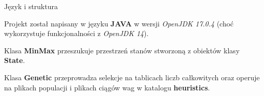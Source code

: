 \begin{frame}{Język i struktura}

    \large
    Projekt został napisany w języku \textbf{JAVA} w wersji \textit{OpenJDK 17.0.4} (choć wykorzystuje funkcjonalności z \textit{OpenJDK 14}).
    
    Klasa \textbf{MinMax} przeszukuje przestrzeń stanów stworzoną z obiektów klasy \textbf{State}.

    Klasa \textbf{Genetic} przeprowadza selekcje na tablicach liczb całkowitych oraz operuje na plikach populacji i plikach ciągów wag w katalogu \textbf{heuristics}.





\end{frame}
